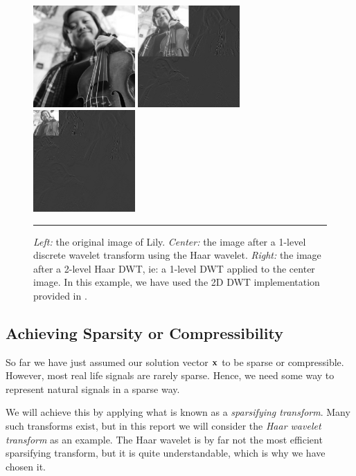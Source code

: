 \begin{figure}[t]
	\centering
	\includegraphics[width=110pt]{figs/lily.jpg}
	\hspace{\columnsep}
	\includegraphics[width=110pt]{figs/lily_wavelet1.jpg}
	\hspace{\columnsep}
	\includegraphics[width=110pt]{figs/lily_wavelet2.jpg}
	\caption{\textit{Left:} the original image of Lily. \textit{Center:} the image after a 1-level discrete wavelet transform using the Haar wavelet. \textit{Right:} the image after a 2-level Haar DWT, ie: a 1-level DWT applied to the center image. In this example, we have used the 2D DWT implementation provided in \cite{ryan16applinalg}.}
	\label{fig:dwt_sparsifying}
	\vspace{4pt}\hrule
\end{figure}


\subsection{Achieving Sparsity or Compressibility}
So far we have just assumed our solution vector $ \mathbf{x} $ to be sparse or compressible. However, most real life signals are rarely sparse. Hence, we need some way to represent natural signals in a sparse way. 

We will achieve this by applying what is known as a \textit{sparsifying transform}. Many such transforms exist, but in this report we will consider the \textit{Haar wavelet transform} as an example. The Haar wavelet is by far not the most efficient sparsifying transform, but it is quite understandable, which is why we have chosen it. 

